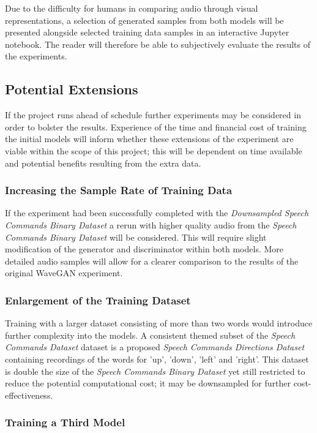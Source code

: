 \documentclass[a4paper, dvipsnames, titlepage]{article}
\begin{document}
Due to the difficulty for humans in comparing audio through visual representations, a selection of generated samples from both models will be presented alongside selected training data samples in an interactive Jupyter notebook.
The reader will therefore be able to subjectively evaluate the results of the experiments.

\subsection{Potential Extensions}

If the project runs ahead of schedule further experiments may be considered in order to bolster the results.
Experience of the time and financial cost of training the initial models will inform whether these extensions of the experiment are viable within the scope of this project; this will be dependent on time available and potential benefits resulting from the extra data.

\subsubsection{Increasing the Sample Rate of Training Data}

If the experiment had been successfully completed with the \textit{Downsampled Speech Commands Binary Dataset} a rerun with higher quality audio from the \textit{Speech Commands Binary Dataset} will be considered.
This will require slight modification of the generator and discriminator within both models.
More detailed audio samples will allow for a clearer comparison to the results of the original WaveGAN experiment.

\subsubsection{Enlargement of the Training Dataset}

Training with a larger dataset consisting of more than two words would introduce further complexity into the models.
A consistent themed subset of the \textit{Speech Commands Dataset} dataset is a proposed \textit{Speech Commands Directions Dataset} containing recordings of the words for 'up', 'down', 'left' and 'right'.
This dataset is double the size of the \textit{Speech Commands Binary Dataset} yet still restricted to reduce the potential computational cost; it may be downsampled for further cost-effectiveness.

\subsubsection{Training a Third Model}
\end{document}
